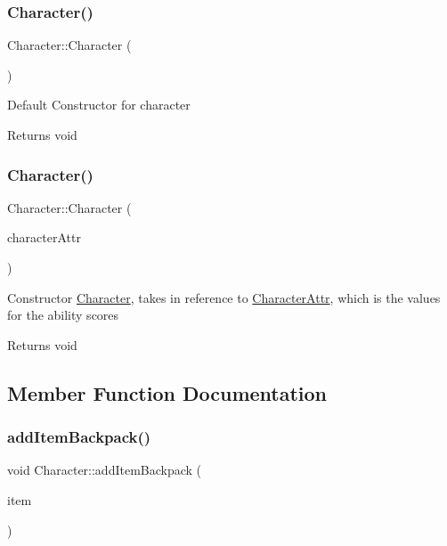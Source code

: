 \subsubsection{\texorpdfstring{Character()}{Character()}\hspace{0.1cm}{\footnotesize\ttfamily [1/2]}}
{\footnotesize\ttfamily Character\+::\+Character (\begin{DoxyParamCaption}{ }\end{DoxyParamCaption})}

Default Constructor for character \begin{DoxyReturn}{Returns}
void 
\end{DoxyReturn}
\hypertarget{class_character_af8ad7b41d5fe3f11be89af54328666d1}{}\label{class_character_af8ad7b41d5fe3f11be89af54328666d1} 
\subsubsection{\texorpdfstring{Character()}{Character()}\hspace{0.1cm}{\footnotesize\ttfamily [2/2]}}
{\footnotesize\ttfamily Character\+::\+Character (\begin{DoxyParamCaption}\item[{\hyperlink{class_character_attr}{Character\+Attr} $\ast$}]{character\+Attr }\end{DoxyParamCaption})}

Constructor \hyperlink{class_character}{Character}, takes in reference to \hyperlink{class_character_attr}{Character\+Attr}, which is the values for the ability scores \begin{DoxyReturn}{Returns}
void 
\end{DoxyReturn}


\subsection{Member Function Documentation}
\hypertarget{class_character_aacd0abef0d28fac92a90d6544fe3984d}{}\label{class_character_aacd0abef0d28fac92a90d6544fe3984d} 
\subsubsection{\texorpdfstring{add\+Item\+Backpack()}{addItemBackpack()}}
{\footnotesize\ttfamily void Character\+::add\+Item\+Backpack (\begin{DoxyParamCaption}\item[{\hyperlink{class_item}{Item}}]{item }\end{DoxyParamCaption})}

